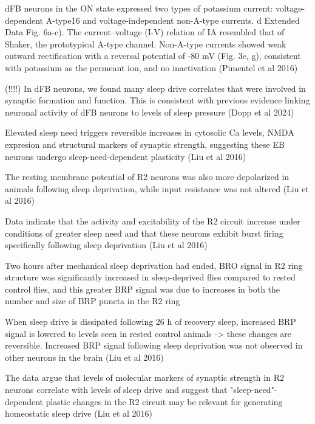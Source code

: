 dFB neurons in the ON state expressed two types of potassium  current: voltage-dependent
        A-type16 and voltage-independent non-A-type currents. d Extended Data Fig. 6a-c).
        The current–voltage (I-V) relation of IA resembled that of Shaker, the  prototypical
        A-type channel. Non-A-type currents showed weak outward rectification with a reversal
        potential of -80 mV (Fig. 3e, g), consistent with potassium as the permeant ion, and
        no inactivation
        \cite{pimentelOperationHomeostaticSleep2016} (Pimentel et al 2016)

(!!!!) In dFB neurons, we found many sleep drive correlates that were involved in synaptic
        formation and function. This is consistent with previous evidence linking neuronal
        activity of dFB neurons to levels of sleep pressure (Dopp et al 2024)

Elevated sleep need triggers reversible increases in cytosolic Ca levels, NMDA expresion and structural markers
    of synaptic strength, suggesting these EB neurons undergo sleep-need-dependent plasticity \cite{liuSleepDriveEncoded2016}
    (Liu et al 2016)

    The resting membrane potential of R2 neurons
    was also more depolarized in animals following sleep deprivation, while input resistance was not altered \cite{liuSleepDriveEncoded2016}
    (Liu et al 2016)

    Data indicate that the activity and excitability of the R2 circuit increase under conditions of greater
    sleep need and that these neurons exhibit burst firing specifically following sleep deprivation \cite{liuSleepDriveEncoded2016}
    (Liu et al 2016)

    Two hours after mechanical sleep deprivation had ended, BRO signal in R2 ring structure was significantly increased in sleep-deprived
    flies compared to rested control flies, and this greater BRP signal was due to increases in both the number and size
    of BRP puncta in the R2 ring \cite{liuSleepDriveEncoded2016}

    When sleep drive is dissipated following 26 h of recovery sleep, increased BRP signal is lowered to levels seen in rested
    control animals -> these changes are reversible. Increased BRP signal following sleep
    deprivation was not observed in other neurons in the brain \cite{liuSleepDriveEncoded2016}
    (Liu et al 2016)

    The data argue that levels of molecular markers of synaptic strength in R2 neurons correlate with levels of sleep
    drive and suggest that "sleep-need"-dependent plastic changes in the R2 circuit may be relevant for generating
    homeostatic sleep drive \cite{liuSleepDriveEncoded2016}
    (Liu et al 2016)

